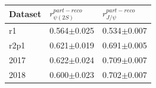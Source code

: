 \begin{tabular}{lll}
\toprule
Dataset & $r_{\psi(2S)}^{part-reco}$ & $r_{J/\psi}^{part-reco}$ \\
\midrule
r1 & 0.564$\pm$0.025 & 0.534$\pm$0.007 \\
r2p1 & 0.621$\pm$0.019 & 0.691$\pm$0.005 \\
2017 & 0.622$\pm$0.024 & 0.709$\pm$0.007 \\
2018 & 0.600$\pm$0.023 & 0.702$\pm$0.007 \\
\bottomrule
\end{tabular}
